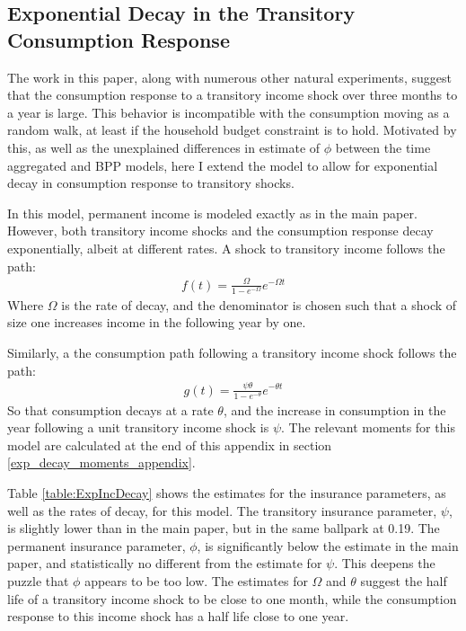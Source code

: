 \subsection{Exponential Decay in the Transitory Consumption Response} \label{exp_decay_appendix}
The work in this paper, along with numerous other natural experiments, suggest that the consumption response to a transitory income shock over three months to a year is large. This behavior is incompatible with the consumption moving as a random walk, at least if the household budget constraint is to hold. Motivated by this, as well as the unexplained differences in estimate of $\phi$ between the time aggregated and BPP models, here I extend the model to allow for exponential decay in consumption response to transitory shocks.

In this model, permanent income is modeled exactly as in the main paper. However, both transitory income shocks and the consumption response decay exponentially, albeit at different rates. A shock to transitory income follows the path:
\begin{align*}
f(t) = \frac{\Omega}{1-e^{-\Omega}} e^{-\Omega t}
\end{align*}
Where $\Omega$ is the rate of decay, and the denominator is chosen such that a shock of size one increases income in the following year by one.

Similarly, a the consumption path following a transitory income shock follows the path:
\begin{align*}
g(t) = \frac{\psi \theta}{1-e^{-\theta}} e^{-\theta t}
\end{align*}
So that consumption decays at a rate $\theta$, and the increase in consumption in the year following a unit transitory income shock is $\psi$. The relevant moments for this model are calculated at the end of this appendix in section \ref{exp_decay_moments_appendix}.

Table \ref{table:ExpIncDecay} shows the estimates for the insurance parameters, as well as the rates of decay, for this model.  The transitory insurance parameter, $\psi$, is slightly lower than in the main paper, but in the same ballpark at 0.19. The permanent insurance parameter, $\phi$, is significantly below the estimate in the main paper, and statistically no different from the estimate for $\psi$. This deepens the puzzle that $\phi$ appears to be too low. The estimates for $\Omega$ and $\theta$ suggest the half life of a transitory income shock to be close to one month, while the consumption response to this income shock has a half life close to one year.


